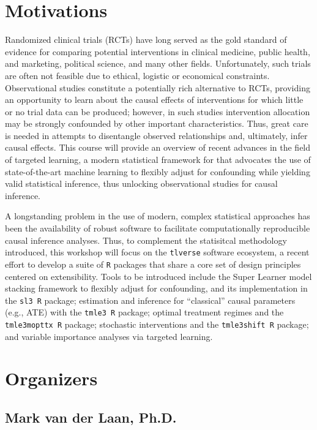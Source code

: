 \documentclass[a4paper,11pt]{texMemo}
\begin{document}
\section{Motivations}

Randomized clinical trials (RCTs) have long served as the gold standard of
evidence for comparing potential interventions in clinical medicine, public
health, and marketing, political science, and many other fields. Unfortunately,
such trials are often not feasible due to ethical, logistic or economical
constraints. Observational studies constitute a potentially rich alternative to
RCTs, providing an opportunity to learn about the causal effects of
interventions for which little or no trial data can be produced; however, in
such studies intervention allocation may be strongly confounded by other
important characteristics. Thus, great care is needed in attempts to disentangle
observed relationships and, ultimately, infer causal effects. This course will
provide an overview of recent advances in the field of targeted learning, a
modern statistical framework for that advocates the use of state-of-the-art
machine learning to flexibly adjust for confounding while yielding valid
statistical inference, thus unlocking observational studies for causal
inference.

A longstanding problem in the use of modern, complex statistical approaches
has been the availability of robust software to facilitate computationally
reproducible causal inference analyses. Thus, to complement the statisitcal
methodology introduced, this workshop will focus on the \texttt{tlverse}
software ecosystem, a recent effort to develop a  suite of \texttt{R} packages
that share a core set of design principles centered on extensibility. Tools to
be introduced include the Super Learner model stacking framework to flexibly
adjust for confounding, and its implementation in the \texttt{sl3 R} package;
estimation and inference for ``classical'' causal parameters (e.g., ATE) with
the \texttt{tmle3 R} package; optimal treatment regimes and the
\texttt{tmle3mopttx R} package; stochastic interventions and the
\texttt{tmle3shift R} package; and variable importance analyses via targeted
learning.

\section{Organizers}

\subsection{Mark van der Laan, Ph.D.}
\end{document}
